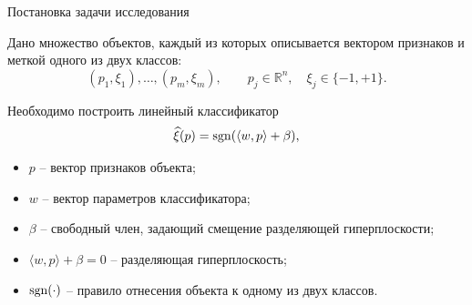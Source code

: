 \SPBGContentSlide
  {Постановка задачи исследования}
  {%
    \Body
    Дано множество объектов, каждый из которых описывается вектором признаков
    и меткой одного из двух классов:
    \[
      (p_1,\xi_1),\ldots,(p_m,\xi_m),
      \qquad
      p_j\in\mathbb{R}^n,\quad \xi_j\in\{-1,+1\}.
    \]

    Необходимо построить линейный классификатор
    \[
      \widehat{\xi}(p)=\operatorname{sgn}(\langle w,p\rangle+\beta),
    \]
\begin{itemize}
  \item \(p\) -- вектор признаков объекта;
  \item \(w\) -- вектор параметров классификатора;
  \item \(\beta\) -- свободный член, задающий смещение разделяющей гиперплоскости;
  \item \(\langle w,p\rangle+\beta=0\) -- разделяющая гиперплоскость;
  \item \(\operatorname{sgn}(\cdot)\) -- правило отнесения объекта к одному из двух классов.
\end{itemize}

  }
